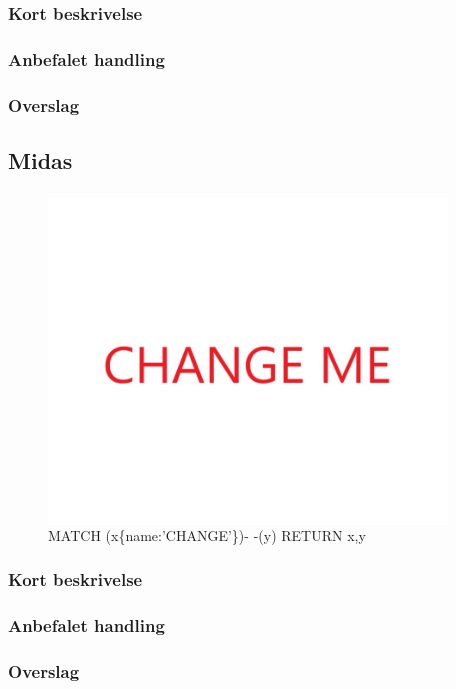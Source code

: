 \documentclass{article}
\begin{document}
\subsubsection{Kort beskrivelse}
\subsubsection{Anbefalet handling}
\subsubsection{Overslag}
\subsection{Midas}
\begin{figure}[h]
\includegraphics[width=300pt]{CHANGE.PNG}
\caption{MATCH (x\{name:'CHANGE'\})- -(y) RETURN x,y}
\end{figure}
\subsubsection{Kort beskrivelse}
\subsubsection{Anbefalet handling}
\subsubsection{Overslag}
\end{document}
